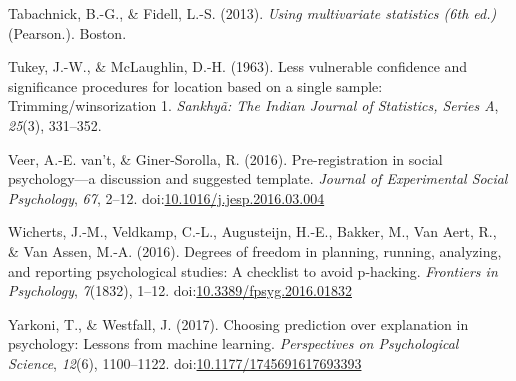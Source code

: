 \documentclass[man,floatsintext]{apa6}
\begin{document}
\leavevmode\hypertarget{ref-Tabachnick_Fidell_2013}{}%
Tabachnick, B.-G., \& Fidell, L.-S. (2013). \emph{Using multivariate statistics (6th ed.)} (Pearson.). Boston.

\leavevmode\hypertarget{ref-Tukey_and_McLaughlin_1963}{}%
Tukey, J.-W., \& McLaughlin, D.-H. (1963). Less vulnerable confidence and significance procedures for location based on a single sample: Trimming/winsorization 1. \emph{Sankhyã: The Indian Journal of Statistics, Series A}, \emph{25}(3), 331--352.

\leavevmode\hypertarget{ref-vantveer_2016}{}%
Veer, A.-E. van't, \& Giner-Sorolla, R. (2016). Pre-registration in social psychology---a discussion and suggested template. \emph{Journal of Experimental Social Psychology}, \emph{67}, 2--12. doi:\href{https://doi.org/10.1016/j.jesp.2016.03.004}{10.1016/j.jesp.2016.03.004}

\leavevmode\hypertarget{ref-Wicherts_et_al_2016}{}%
Wicherts, J.-M., Veldkamp, C.-L., Augusteijn, H.-E., Bakker, M., Van Aert, R., \& Van Assen, M.-A. (2016). Degrees of freedom in planning, running, analyzing, and reporting psychological studies: A checklist to avoid p-hacking. \emph{Frontiers in Psychology}, \emph{7}(1832), 1--12. doi:\href{https://doi.org/10.3389/fpsyg.2016.01832}{10.3389/fpsyg.2016.01832}

\leavevmode\hypertarget{ref-Yarkoni_Westfall_2017}{}%
Yarkoni, T., \& Westfall, J. (2017). Choosing prediction over explanation in psychology: Lessons from machine learning. \emph{Perspectives on Psychological Science}, \emph{12}(6), 1100--1122. doi:\href{https://doi.org/10.1177/1745691617693393}{10.1177/1745691617693393}
\end{document}
